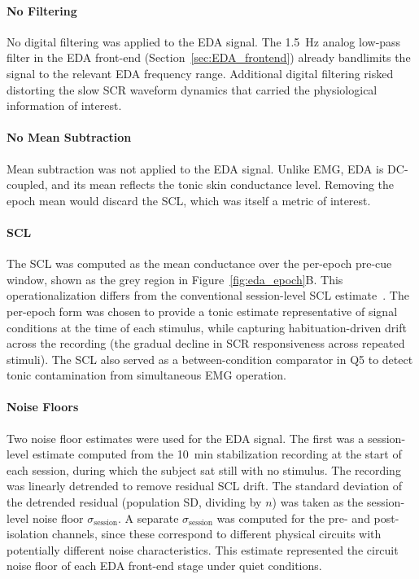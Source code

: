 \paragraph{No Filtering}
No digital filtering was applied to the EDA signal. The \SI{1.5}{\hertz} analog low-pass filter in the EDA front-end (Section~\ref{sec:EDA_frontend}) already bandlimits the signal to the relevant EDA frequency range. Additional digital filtering risked distorting the slow SCR waveform dynamics that carried the physiological information of interest.

\paragraph{No Mean Subtraction}
Mean subtraction was not applied to the EDA signal. Unlike EMG, EDA is DC-coupled, and its mean reflects the tonic skin conductance level. Removing the epoch mean would discard the SCL, which was itself a metric of interest.

\paragraph{SCL} 
The SCL was computed as the mean conductance over the per-epoch pre-cue window, shown as the grey region in Figure~\ref{fig:eda_epoch}B. This operationalization differs from the conventional session-level SCL estimate~\cite{boucsein_electrodermal_2012}. The per-epoch form was chosen to provide a tonic estimate representative of signal conditions at the time of each stimulus, while capturing habituation-driven drift across the recording (the gradual decline in SCR responsiveness across repeated stimuli). The SCL also served as a between-condition comparator in Q5 to detect tonic contamination from simultaneous EMG operation.

\paragraph{Noise Floors} 
Two noise floor estimates were used for the EDA signal. The first was a session-level estimate computed from the \SI{10}{\minute} stabilization recording at the start of each session, during which the subject sat still with no stimulus. The recording was linearly detrended to remove residual SCL drift. The standard deviation of the detrended residual (population SD, dividing by $n$) was taken as the session-level noise floor $\sigma_\text{session}$. A separate $\sigma_\text{session}$ was computed for the pre- and post-isolation channels, since these correspond to different physical circuits with potentially different noise characteristics. This estimate represented the circuit noise floor of each EDA front-end stage under quiet conditions.

